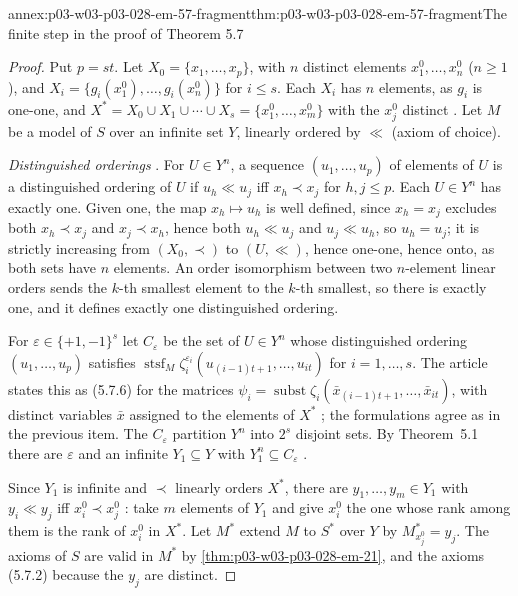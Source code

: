 \begin{annexitem}{annex:p03-w03-p03-028-em-57-fragment}{thm:p03-w03-p03-028-em-57-fragment}{The finite step in the proof of Theorem 5.7}
\begin{proof}
Put \(p=st\).  Let \(X_0=\{x_1,\ldots,x_p\}\), with \(n\) distinct elements
\(x^0_1,\ldots,x^0_n\) (\(n\geq1\)), and \(X_i=\{g_i(x^0_1),\ldots,g_i(x^0_n)\}\)
for \(i\leq s\).  Each \(X_i\) has \(n\) elements, as \(g_i\) is one-one, and
\(X^*=X_0\cup X_1\cup\cdots\cup X_s=\{x^0_1,\ldots,x^0_m\}\) with the
\(x^0_j\) distinct \cite[(5.7.5), p.~64]{EhrenfeuchtMostowski1956}.  Let \(M\)
be a model of \(S\) over an infinite set \(Y\), linearly ordered by \(\ll\)
(axiom of choice).

\emph{Distinguished orderings} \cite[p.~64]{EhrenfeuchtMostowski1956}.  For
\(U\in Y^n\), a sequence \((u_1,\ldots,u_p)\) of elements of \(U\) is a
distinguished ordering of \(U\) if \(u_h\ll u_j\) iff \(x_h\prec x_j\) for
\(h,j\leq p\).  Each \(U\in Y^n\) has exactly one.  Given one, the map
\(x_h\mapsto u_h\) is well defined, since \(x_h=x_j\) excludes both
\(x_h\prec x_j\) and \(x_j\prec x_h\), hence both \(u_h\ll u_j\) and
\(u_j\ll u_h\), so \(u_h=u_j\); it is strictly increasing from \((X_0,\prec)\)
to \((U,\ll)\), hence one-one, hence onto, as both sets have \(n\) elements.
An order isomorphism between two \(n\)-element linear orders sends the
\(k\)-th smallest element to the \(k\)-th smallest, so there is exactly one,
and it defines exactly one distinguished ordering.

For \(\varepsilon\in\{+1,-1\}^s\) let \(C_\varepsilon\) be the set of
\(U\in Y^n\) whose distinguished ordering \((u_1,\ldots,u_p)\) satisfies
\(\operatorname{stsf}_M\zeta_i^{\varepsilon_i}(u_{(i-1)t+1},\ldots,u_{it})\)
for \(i=1,\ldots,s\).  The article states this as (5.7.6) for the matrices
\(\psi_i=\operatorname{subst}\zeta_i(\bar x_{(i-1)t+1},\ldots,\bar x_{it})\),
with distinct variables \(\bar x\) assigned to the elements of \(X^*\)
\cite[p.~64]{EhrenfeuchtMostowski1956}; the formulations agree as in the
previous item.  The \(C_\varepsilon\) partition \(Y^n\) into \(2^s\) disjoint
sets.  By Theorem~5.1 there are \(\varepsilon\) and an infinite
\(Y_1\subseteq Y\) with \(Y_1^n\subseteq C_\varepsilon\)
\cite[pp.~64--65]{EhrenfeuchtMostowski1956}.

Since \(Y_1\) is infinite and \(\prec\) linearly orders \(X^*\), there are
\(y_1,\ldots,y_m\in Y_1\) with \(y_i\ll y_j\) iff \(x^0_i\prec x^0_j\)
\cite[(5.7.7), p.~65]{EhrenfeuchtMostowski1956}: take \(m\) elements of \(Y_1\)
and give \(x^0_i\) the one whose rank among them is the rank of \(x^0_i\) in
\(X^*\).  Let \(M^*\) extend \(M\) to \(S^*\) over \(Y\) by
\(M^*_{x^0_j}=y_j\).  The axioms of \(S\) are valid in \(M^*\) by
\cref{thm:p03-w03-p03-028-em-21}, and the axioms (5.7.2) because the \(y_j\)
are distinct.


\end{proof}
\end{annexitem}
